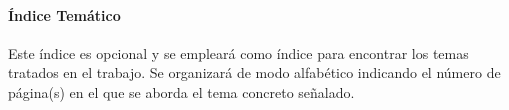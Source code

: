 
\paragraph{Índice Temático}
Este índice es opcional y se empleará como índice para encontrar los temas tratados en el trabajo. Se organizará de modo alfabético indicando el número de página(s) en el que se aborda el tema concreto señalado.
